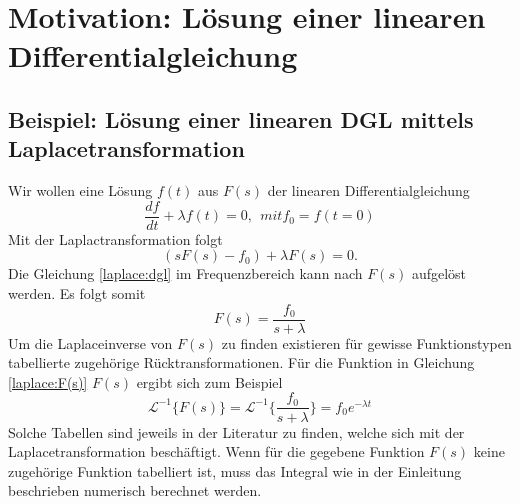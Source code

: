 %
%
%



\section{Motivation: Lösung einer linearen Differentialgleichung
\label{laplace:section:problemstellung}}
\subsection{Beispiel: Lösung einer linearen DGL mittels Laplacetransformation}
Wir wollen eine Lösung $f(t)$ aus $F(s)$ der linearen Differentialgleichung 
\[
\frac{df}{dt} + \lambda f(t) = 0, ~~mit f_{0} = f(t=0)
\]
Mit der Laplactransformation folgt
\begin{equation}
(sF(s) - f_{0}) + \lambda F(s) = 0.
\label{laplace:dgl}
\end{equation}
Die Gleichung \eqref{laplace:dgl} im Frequenzbereich kann nach $F(s)$ aufgelöst werden.
Es folgt somit
\begin{equation}
F(s) = \frac{f_{0}}{s + \lambda}
\label{laplace:F(s)}
\end{equation}
Um die Laplaceinverse von $F(s)$ zu finden existieren für gewisse Funktionstypen tabellierte zugehörige Rücktransformationen.
Für die Funktion in Gleichung \eqref{laplace:F(s)} $F(s)$ ergibt sich zum Beispiel
\[
\mathcal{L}^{-1}\{F(s)\}=\mathcal{L}^{-1}\{\frac{f_{0}}{s+\lambda}\} = f_{0}e^{-\lambda t}
\]
Solche Tabellen sind jeweils in der Literatur zu finden, welche sich mit der Laplacetransformation beschäftigt.
Wenn für die gegebene Funktion $F(s)$ keine zugehörige Funktion tabelliert ist, muss das Integral wie in der Einleitung beschrieben numerisch berechnet werden.

